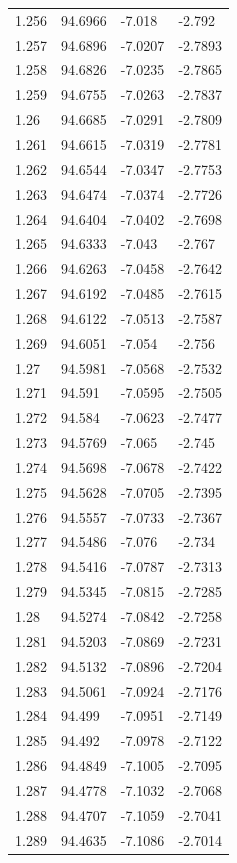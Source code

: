 \begin{tabular}{llll}
1.256 & 94.6966 & -7.018 & -2.792 \\
1.257 & 94.6896 & -7.0207 & -2.7893 \\
1.258 & 94.6826 & -7.0235 & -2.7865 \\
1.259 & 94.6755 & -7.0263 & -2.7837 \\
1.26 & 94.6685 & -7.0291 & -2.7809 \\
1.261 & 94.6615 & -7.0319 & -2.7781 \\
1.262 & 94.6544 & -7.0347 & -2.7753 \\
1.263 & 94.6474 & -7.0374 & -2.7726 \\
1.264 & 94.6404 & -7.0402 & -2.7698 \\
1.265 & 94.6333 & -7.043 & -2.767 \\
1.266 & 94.6263 & -7.0458 & -2.7642 \\
1.267 & 94.6192 & -7.0485 & -2.7615 \\
1.268 & 94.6122 & -7.0513 & -2.7587 \\
1.269 & 94.6051 & -7.054 & -2.756 \\
1.27 & 94.5981 & -7.0568 & -2.7532 \\
1.271 & 94.591 & -7.0595 & -2.7505 \\
1.272 & 94.584 & -7.0623 & -2.7477 \\
1.273 & 94.5769 & -7.065 & -2.745 \\
1.274 & 94.5698 & -7.0678 & -2.7422 \\
1.275 & 94.5628 & -7.0705 & -2.7395 \\
1.276 & 94.5557 & -7.0733 & -2.7367 \\
1.277 & 94.5486 & -7.076 & -2.734 \\
1.278 & 94.5416 & -7.0787 & -2.7313 \\
1.279 & 94.5345 & -7.0815 & -2.7285 \\
1.28 & 94.5274 & -7.0842 & -2.7258 \\
1.281 & 94.5203 & -7.0869 & -2.7231 \\
1.282 & 94.5132 & -7.0896 & -2.7204 \\
1.283 & 94.5061 & -7.0924 & -2.7176 \\
1.284 & 94.499 & -7.0951 & -2.7149 \\
1.285 & 94.492 & -7.0978 & -2.7122 \\
1.286 & 94.4849 & -7.1005 & -2.7095 \\
1.287 & 94.4778 & -7.1032 & -2.7068 \\
1.288 & 94.4707 & -7.1059 & -2.7041 \\
1.289 & 94.4635 & -7.1086 & -2.7014 \\

\end{tabular}
